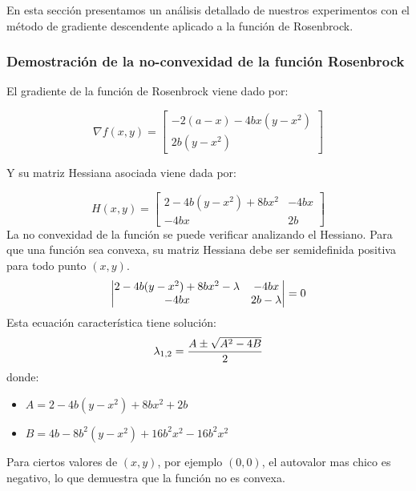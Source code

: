 \documentclass{tp02}
\begin{document}
En esta sección presentamos un análisis detallado de nuestros experimentos
con el método de gradiente descendente aplicado a la función de Rosenbrock.

\subsubsection{Demostración de la no-convexidad de la función Rosenbrock}

El gradiente de la función de Rosenbrock viene dado por:

\begin{equation}
\nabla f(x,y) = \begin{bmatrix}
-2(a-x) - 4bx(y-x^2) \\
2b(y-x^2)
\end{bmatrix}
\label{gradiente}
\end{equation}

Y su matriz Hessiana asociada viene dada por: 

\begin{equation}
H(x,y) = \begin{bmatrix}
2 - 4b(y-x^2) + 8bx^2 & -4bx \\
-4bx & 2b
\end{bmatrix}
\label{hessiano}
\end{equation}
La no convexidad de la función se puede verificar analizando el Hessiano. Para que una función
sea convexa, su matriz Hessiana debe ser semidefinida positiva para todo punto $(x,y)$.
\begin{equation}
\centering
\begin{vmatrix}
2 - 4b(y-x^2) + 8bx^2 - \lambda & -4bx \\
-4bx & 2b - \lambda
\end{vmatrix} = 0
\label{det}
\end{equation}
Esta ecuación característica tiene solución:
\begin{equation}
    \centering
    \lambda_{1,2} = \frac{A \pm \sqrt{A^2 - 4B}}{2}
    \label{eigenvalues}
\end{equation}
donde:
\begin{itemize}
    \item $A = 2 - 4b(y-x^2) + 8bx^2 + 2b$
    \item $B = 4b - 8b^2(y-x^2) + 16b^2x^2 - 16b^2x^2$
\end{itemize}
Para ciertos valores de $(x,y)$, por ejemplo $(0,0)$, el autovalor
mas chico es negativo, lo que demuestra que la función no es convexa.
\end{document}
